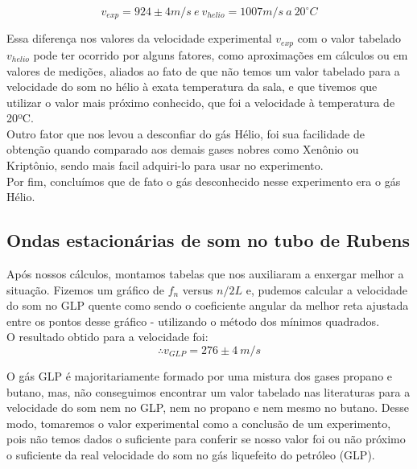 \[v_{exp} = 924 \pm 4 m/s \ e \ v_{helio} = 1007 m/s \  a \ 20^\circ C \]

Essa diferença nos valores da velocidade experimental $v_{exp}$ com o valor tabelado $v_{helio}$ pode ter ocorrido por alguns fatores, como aproximações em cálculos ou em valores de medições, aliados ao fato de que não temos um valor tabelado para a velocidade do som no hélio à exata temperatura da sala, e que tivemos que utilizar o valor mais próximo conhecido, que foi a velocidade à temperatura de 20ºC.\\  

Outro fator que nos levou a desconfiar do gás Hélio, foi sua facilidade de obtenção quando comparado aos demais gases nobres como Xenônio ou Kriptônio, sendo mais facil adquiri-lo para usar no experimento.\\

Por fim, concluímos que de fato o gás desconhecido nesse experimento era o gás Hélio.

\subsection{Ondas estacionárias de som no tubo de Rubens}

Após nossos cálculos, montamos tabelas que nos auxiliaram a enxergar melhor a situação. Fizemos um gráfico de $f_n$ versus $n/2L$ e, pudemos calcular a velocidade do som no GLP quente como sendo o coeficiente angular da melhor reta ajustada entre os pontos desse gráfico - utilizando o método dos mínimos quadrados.\\

O resultado obtido para a velocidade foi:
\[ \therefore v_{GLP} = 276 \pm 4 \ m/s \]

O gás GLP é majoritariamente formado por uma mistura dos gases propano e butano, mas, não conseguimos encontrar um valor tabelado nas literaturas para a velocidade do som nem no GLP, nem no propano e nem mesmo no butano. Desse modo, tomaremos o valor experimental como a conclusão de um experimento, pois não temos dados o suficiente para conferir se nosso valor foi ou não próximo o suficiente da real velocidade do som no gás liquefeito do petróleo (GLP). 
